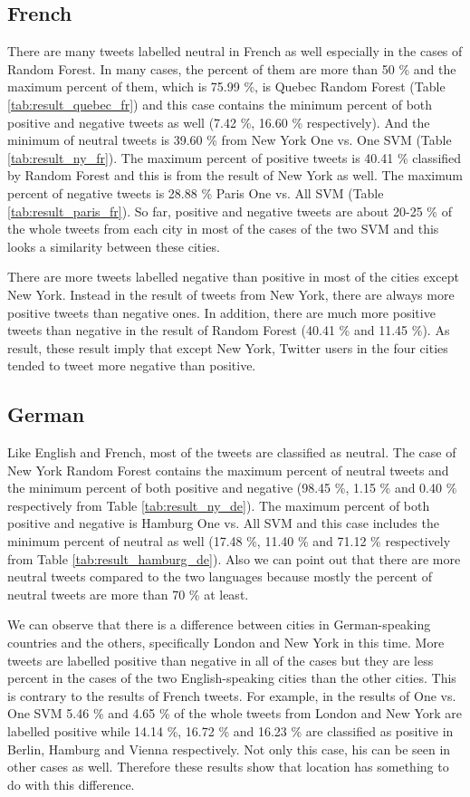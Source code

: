 \subsection{French}
There are many tweets labelled neutral in French as well especially in the cases of Random Forest.
In many cases, the percent of them are more than 50 \% and the maximum percent of them, which is 75.99 \%, is Quebec Random Forest (Table \ref{tab:result_quebec_fr}) and this case contains the minimum percent of both positive and negative tweets as well (7.42 \%, 16.60 \% respectively).
And the minimum of neutral tweets is 39.60 \% from New York One vs. One SVM (Table \ref{tab:result_ny_fr}).
The maximum percent of positive tweets is 40.41 \% classified by Random Forest and this is from the result of New York as well.
The maximum percent of negative tweets is 28.88 \% Paris One vs. All SVM (Table \ref{tab:result_paris_fr}). 
So far, positive and negative tweets are about 20-25 \% of the whole tweets from each city in most of the cases of the two SVM and this looks a similarity between these cities.

There are more tweets labelled negative than positive in most of the cities except New York.
Instead in the result of tweets from New York, there are always more positive tweets than negative ones.
In addition, there are much more positive tweets than negative in the result of Random Forest (40.41 \% and 11.45 \%).
As result, these result imply that except New York, Twitter users in the four cities tended to tweet more negative than positive.

\subsection{German}
Like English and French, most of the tweets are classified as neutral.
The case of New York Random Forest contains the maximum percent of neutral tweets and the minimum percent of both positive and negative (98.45 \%, 1.15 \% and 0.40 \% respectively from Table \ref{tab:result_ny_de}).
The maximum percent of both positive and negative is Hamburg One vs. All SVM and this case includes the minimum percent of neutral as well (17.48 \%, 11.40 \% and 71.12 \% respectively from Table \ref{tab:result_hamburg_de}).
Also we can point out that there are more neutral tweets compared to the two languages because mostly the percent of neutral tweets are more than 70 \% at least.

We can observe that there is a difference between cities in German-speaking countries and the others, specifically London and New York in this time.
More tweets are labelled positive than negative in all of the cases but they are less percent in the cases of the two English-speaking cities than the other cities.
This is contrary to the results of French tweets.
For example, in the results of One vs. One SVM 5.46 \% and 4.65 \% of the whole tweets from London and New York are labelled positive while 14.14 \%, 16.72 \% and 16.23 \% are classified as positive in Berlin, Hamburg and Vienna respectively. 
Not only this case, his can be seen in other cases as well.  
Therefore these results show that location has something to do with this difference.
